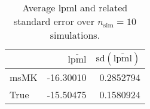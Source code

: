\begin{table}[H]

\caption{Average lpml and related standard error over $n_{\text{sim}} = 10$ simulations.}
\centering
\begin{tabular}[t]{lrr}
\toprule
  & $\overbar{\text{lpml}}$ & $\text{sd}(\overbar{\text{lpml}})$\\
\midrule
msMK & -16.30010 & 0.2852794\\
True & -15.50475 & 0.1580924\\
\bottomrule
\end{tabular}
\end{table}